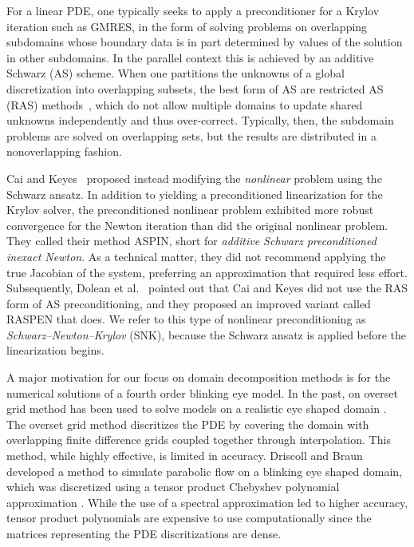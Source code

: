 For a linear PDE, one typically seeks to apply a preconditioner for a Krylov iteration such as GMRES, in the form of solving problems on overlapping subdomains whose boundary data is in part determined by values of the solution in other subdomains. In the parallel context this is achieved by an additive Schwarz (AS) scheme. When one partitions the unknowns of a global discretization into overlapping subsets, the best form of AS are restricted AS (RAS) methods~\cite{Cai1999}, which do not allow multiple domains to update shared unknowns independently and thus over-correct. Typically, then, the subdomain problems are solved on overlapping sets, but the results are distributed in a nonoverlapping fashion. 
%

Cai and Keyes~\cite{Cai2002} proposed instead modifying the \emph{nonlinear} problem using the Schwarz ansatz. In addition to yielding a preconditioned linearization for the Krylov solver, the preconditioned nonlinear problem exhibited more robust convergence for the Newton iteration than did the original nonlinear problem. They called their method ASPIN, short for \textit{additive Schwarz preconditioned inexact Newton}. As a technical matter, they did not recommend applying the true Jacobian of the system, preferring an approximation that required less effort. Subsequently, Dolean et al.~\cite{Dolean2016} pointed out that Cai and Keyes did not use the RAS form of AS preconditioning, and they proposed an improved variant called RASPEN that does. We refer to this type of nonlinear preconditioning as \emph{Schwarz--Newton--Krylov} (SNK), because the Schwarz ansatz is applied before the linearization begins.

A major motivation for our focus on domain decomposition methods is for the numerical solutions of a fourth order blinking eye model. In the past, on overset grid method has been used to solve models on a realistic eye shaped domain \cite{chesshire1990composite,henshaw1998ogen,li2012model,li2015computed}. The overset grid method discritizes the PDE by covering the domain with overlapping finite difference grids coupled together through interpolation. This method, while highly effective, is limited in accuracy. Driscoll and Braun developed a method to simulate parabolic flow on a blinking eye shaped domain, which was discretized using a tensor product Chebyshev polynomial approximation \cite{driscoll2018simulation}. While the use of a spectral approximation led to higher accuracy, tensor product polynomials are expensive to use computationally since the matrices representing the PDE discritizations are dense.

